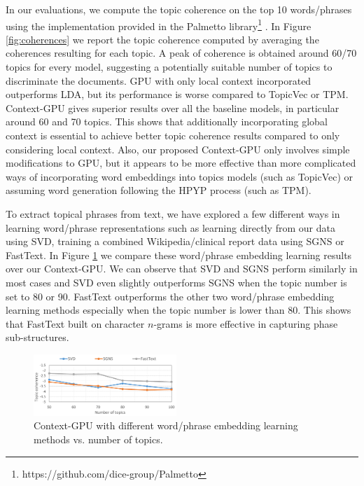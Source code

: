 \documentclass[letterpaper]{article}
\begin{document}
In our evaluations, we compute the topic coherence on the top 10 words/phrases using the implementation provided in the Palmetto library\footnote{https://github.com/dice-group/Palmetto} \cite{Roder15}. 
In Figure \ref{fig:coherences} we report the topic coherence computed by averaging the coherences resulting for each topic. %
A peak of coherence is obtained around 60/70 topics for every model, suggesting a potentially suitable number of topics to discriminate the documents. GPU with only local context incorporated outperforms LDA, but its performance is worse compared to TopicVec or TPM. 
Context-GPU gives superior results over all the baseline models, in particular around 60 and 70 topics. This shows that additionally incorporating global context is essential to achieve better topic coherence results compared to only considering local context. Also, our proposed Context-GPU only involves simple modifications to GPU, but it appears to be more effective than more complicated ways of incorporating word embeddings into topics models (such as TopicVec) or assuming word generation following the HPYP process (such as TPM). 



To extract topical phrases from text, we have explored a few different ways in learning word/phrase representations such as learning directly from our data using SVD, training a combined Wikipedia/clinical report data using SGNS or FastText. In Figure \ref{fig:embeddings} we compare these word/phrase embedding learning results over our Context-GPU. %
We can observe that SVD and SGNS perform similarly in most cases and SVD even slightly outperforms SGNS when the topic number is set to 80 or 90. FastText outperforms the other two word/phrase embedding learning methods especially when the topic number is lower than 80. This shows that FastText built on character $n$-grams is more effective in capturing phase sub-structures. 

\begin{figure}[h!]
  \centering
\includegraphics[width=0.48\textwidth]{model_embedding_cropped.pdf}
\caption{Context-GPU with different word/phrase embedding learning methods vs. number of topics.}
\label{fig:embeddings}
\end{figure}
\end{document}

